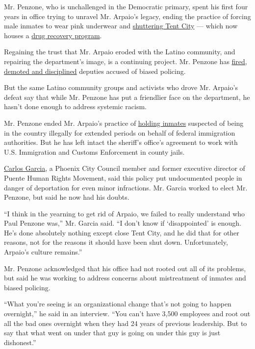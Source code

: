 Mr. Penzone, who is unchallenged in the Democratic primary, spent his
first four years in office trying to unravel Mr. Arpaio's legacy, ending
the practice of forcing male inmates to wear pink underwear and
\href{https://www.nytimes3xbfgragh.onion/2017/04/04/us/arpaio-tent-city-maricopa-sheriff-penzone.html}{shuttering
Tent City} --- which now houses a
\href{https://kjzz.org/content/550808/former-tent-city-jail-facility-house-drug-treatment-program}{drug
recovery program}.

Regaining the trust that Mr. Arpaio eroded with the Latino community,
and repairing the department's image, is a continuing project. Mr.
Penzone has
\href{https://ktar.com/story/2339892/sheriff-paul-penzone-said-hes-fired-employees-for-racial-profiling/}{fired,
demoted and disciplined} deputies accused of biased policing.

But the same Latino community groups and activists who drove Mr.
Arpaio's defeat say that while Mr. Penzone has put a friendlier face on
the department, he hasn't done enough to address systemic racism.

Mr. Penzone ended Mr. Arpaio's practice of
\href{https://www.azcentral.com/story/news/local/phoenix/2017/02/17/maricopa-county-sheriffs-office-courtesy-holds-federal-immigration-agents-ice/98072980/}{holding
inmates} suspected of being in the country illegally for extended
periods on behalf of federal immigration authorities. But he has left
intact the sheriff's office's agreement to work with U.S. Immigration
and Customs Enforcement in county jails.

\href{https://www.phoenix.gov/district8}{Carlos Garcia}, a Phoenix City
Council member and former executive director of Puente Human Rights
Movement, said this policy put undocumented people in danger of
deportation for even minor infractions. Mr. Garcia worked to elect Mr.
Penzone, but said he now had his doubts.

``I think in the yearning to get rid of Arpaio, we failed to really
understand who Paul Penzone was,'' Mr. Garcia said. ``I don't know if
`disappointed' is enough. He's done absolutely nothing except close Tent
City, and he did that for other reasons, not for the reasons it should
have been shut down. Unfortunately, Arpaio's culture remains.''

Mr. Penzone acknowledged that his office had not rooted out all of its
problems, but said he was working to address concerns about mistreatment
of inmates and biased policing.

``What you're seeing is an organizational change that's not going to
happen overnight,'' he said in an interview. ``You can't have 3,500
employees and root out all the bad ones overnight when they had 24 years
of previous leadership. But to say that what went on under that guy is
going on under this guy is just dishonest.''

